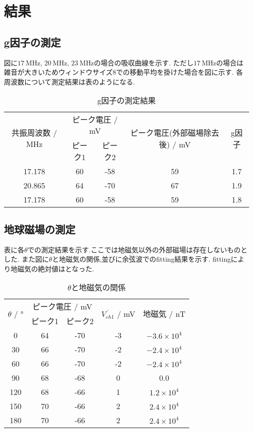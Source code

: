 \section{結果}
\subsection{g因子の測定}
図に$17\ \si{\mega\hertz}$, $20\ \si{\mega\hertz}$, $23\ \si{\mega\hertz}$の場合の吸収曲線を示す.
ただし$17\ \si{\mega\hertz}$の場合は雑音が大きいためウィンドウサイズ8での移動平均を掛けた場合を図に示す.
各周波数について測定結果は表のようになる.
\begin{table}[h]
\caption{g因子の測定結果}
\label{tab:ginsi}
\centering
\begin{tabular}{ccccc}
\hline
\multirow{2}{*}{共振周波数 / MHz}&\multicolumn{2}{c}{ピーク電圧 / mV}&\multirow{2}{*}{ピーク電圧(外部磁場除去後) / mV}&\multirow{2}{*}{g因子}\\
&ピーク1&ピーク2\\
\hline \hline
17.178&60&-58&59&1.7\\
20.865&64&-70&67&1.9\\
17.178&60&-58&59&1.8\\
\hline
\end{tabular}
\end{table}
\begin{figure}[htbp]
  \begin{minipage}{0.5\hsize}
  \end{minipage}
  \begin{minipage}{0.5\hsize}
  \end{minipage}
\end{figure}
\subsection{地球磁場の測定}
表に各$\theta$での測定結果を示す.ここでは地磁気以外の外部磁場は存在しないものとした.
また図に$\theta$と地磁気の関係,並びに余弦波でのfitting結果を示す.
fittingにより地磁気の絶対値はとなった.
\begin{table}[h]
\caption{$\theta$と地磁気の関係}
\label{tab:tijiki}
\centering
\begin{tabular}{ccccc}
\hline
\multirow{2}{*}{$\theta$ / $\si{\degree}$}&\multicolumn{2}{c}{ピーク電圧 / mV}&\multirow{2}{*}{$\overline{V_{ch1}}$ / mV}&\multirow{2}{*}{地磁気 / nT}\\
&ピーク1&ピーク2\\
\hline \hline
0 & 64 & -70 & -3 & $-3.6\times10^4$ \\
30 & 66 & -70 & -2 & $-2.4\times10^4$ \\
60 & 66 & -70 & -2 & $-2.4\times10^4$ \\
90 & 68 & -68 & 0 & 0.0 \\
120 & 68 & -66 & 1 & $1.2\times10^4$ \\
150 & 70 & -66 & 2 & $2.4\times10^4$ \\
180 & 70 & -66 & 2 & $2.4\times10^4$ \\
\hline
\end{tabular}
\end{table}
